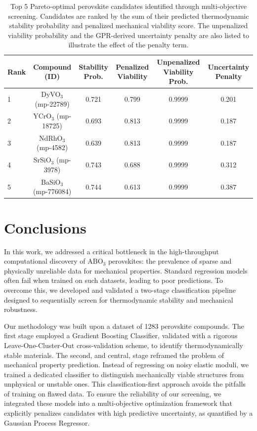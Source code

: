 \documentclass[]{article}
\begin{document}
\begin{table}[t]
\centering
\caption{Top 5 Pareto-optimal perovskite candidates identified through multi-objective screening. Candidates are ranked by the sum of their predicted thermodynamic stability probability and penalized mechanical viability score. The unpenalized viability probability and the GPR-derived uncertainty penalty are also listed to illustrate the effect of the penalty term.}
\label{tab:candidates}
\begin{tabular}{lccccc}
\hline
\hline
Rank & Compound (ID) & Stability Prob. & Penalized Viability & Unpenalized Viability Prob. & Uncertainty Penalty \\
\hline
1 & DyVO$_3$ (mp-22789) & 0.721 & 0.799 & 0.9999 & 0.201 \\
2 & YCrO$_3$ (mp-18725) & 0.693 & 0.813 & 0.9999 & 0.187 \\
3 & NdRhO$_3$ (mp-4582) & 0.639 & 0.813 & 0.9999 & 0.187 \\
4 & SrSiO$_3$ (mp-3978) & 0.743 & 0.688 & 0.9999 & 0.312 \\
5 & BaSiO$_3$ (mp-776084) & 0.744 & 0.613 & 0.9999 & 0.387 \\
\hline
\end{tabular}
\end{table}

\section{Conclusions}
\label{sec:conclusions}
In this work, we addressed a critical bottleneck in the high-throughput computational discovery of ABO$_3$ perovskites: the prevalence of sparse and physically unreliable data for mechanical properties. Standard regression models often fail when trained on such datasets, leading to poor predictions. To overcome this, we developed and validated a two-stage classification pipeline designed to sequentially screen for thermodynamic stability and mechanical robustness.

Our methodology was built upon a dataset of 1283 perovskite compounds. The first stage employed a Gradient Boosting Classifier, validated with a rigorous Leave-One-Cluster-Out cross-validation scheme, to identify thermodynamically stable materials. The second, and central, stage reframed the problem of mechanical property prediction. Instead of regressing on noisy elastic moduli, we trained a dedicated classifier to distinguish mechanically viable structures from unphysical or unstable ones. This classification-first approach avoids the pitfalls of training on flawed data. To ensure the reliability of our screening, we integrated these models into a multi-objective optimization framework that explicitly penalizes candidates with high predictive uncertainty, as quantified by a Gaussian Process Regressor.
\end{document}

